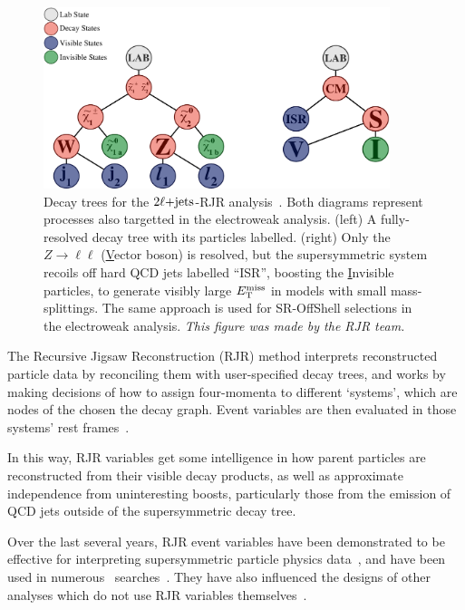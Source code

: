 \begin{figure}[tp]
\centering
\includegraphics[width=0.9\textwidth]{figures/2ljets_rjr_trees.pdf}
\caption{%
Decay trees for the $2\ell\mathrm{+jets}$-RJR analysis~\cite{atlas2022searches}.
Both diagrams represent processes also targetted in the electroweak analysis.
(left) A fully-resolved decay tree with its particles labelled.
(right) Only the $Z\rightarrow\ell\ell$ (\underline{V}ector boson)
is resolved, but the supersymmetric system recoils off
hard QCD jets labelled ``ISR'', boosting the \underline{I}nvisible particles,
to generate visibly large $E_\mathrm{T}^\mathrm{miss}$ in models with small mass-splittings.
The same approach is used for SR-OffShell selections in the electroweak
analysis.
\emph{This figure was made by the RJR team.}
}
\label{fig:2ljets_rjr_decay_trees}
\end{figure}

The Recursive Jigsaw Reconstruction (RJR) method interprets reconstructed
particle data by reconciling them with user-specified decay trees, and works
by making decisions of how to assign four-momenta to different `systems',
which are nodes of the chosen the decay graph.
Event variables are then evaluated in those systems' rest
frames~\cite{jackson2017sparticles, jackson2017rjr}.

In this way, RJR variables get some intelligence in how parent particles are
reconstructed from their visible decay products, as well as approximate
independence from uninteresting boosts, particularly those from the emission of
QCD jets outside of the supersymmetric decay tree.

Over the last several years, RJR event variables have been demonstrated to be
effective for interpreting supersymmetric particle physics
data~\cite{santoni2018probing},
and have been used in numerous \atlas\ searches~\cite{%
atlas_rjr_SUSY_2016_07,
atlas_rjr_SUSY_2016_15,
atlas_rjr_SUSY_2016_16,
atlas_rjr_23l_SUSY_2017_03,
atlas_rjr_SUSY_2018_12,
atlas_rjr_EXOT_2019_19,
atlas_rjr_3l_SUSY_2019_09
}.
They have also influenced the designs of other analyses which do not use
RJR variables themselves~\cite{atlas_rjr_mimic_SUSY_2018_06}.


